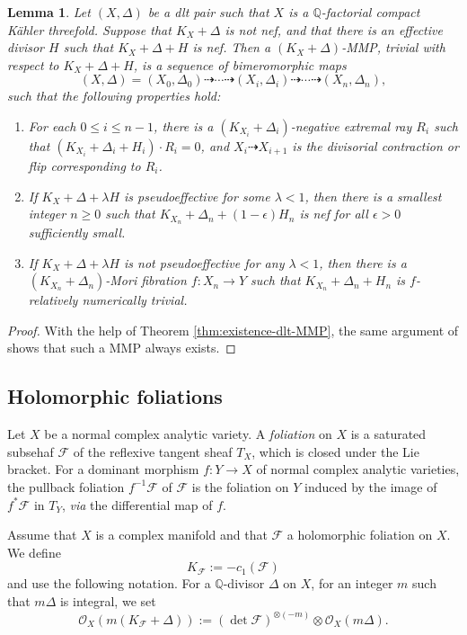 \documentclass[12pt]{amsart}
\newcommand{\<}{\leq}
\def\>{\geq}
\newcommand{\bir}{\dashrightarrow}
\newcommand{\D}{\Delta}
\def\mcO{\mathcal{O}}
\def\mcF{\mathcal{F}}
\newtheorem{lemma}[theorem]{Lemma}
\theoremstyle{remark}
\theoremstyle{definition}
\theoremstyle{definition}
\numberwithin{equation}{section}
\theoremstyle{definition}
\theoremstyle{definition}
\begin{document}
\begin{lemma}
\label{lem:special-mmp}  
Let $(X,\D)$ be a dlt pair such that $X$ is a $\mathbb{Q}$-factorial  compact K\"ahler threefold.  
    Suppose that $K_X+\Delta$ is   not nef, 
    and that there is an effective  divisor $H$  such that $K_X+\Delta+H$ is nef. 
    Then  a $(K_X+\Delta)$-MMP, trivial with respect to $K_X+\Delta+H$, is a sequence of bimeromorphic maps
 \[
        (X, \Delta)=(X_0, \Delta_0)\bir  \cdots \bir (X_i, \Delta_i)\bir\cdots \bir (X_n, \Delta_n), 
 \]
 such that the following properties hold:
\begin{enumerate}
\item For each $0\<i\<n-1$, there is a $(K_{X_i}+\Delta_i)$-negative extremal ray $R_i$ such that $(K_{X_i}+\Delta_i+H_i)\cdot R_i=0$, and $X_i\bir X_{i+1}$ is the divisorial contraction or flip corresponding  to $R_i$.
\item If $K_X+\Delta+\lambda H$ is pseudoeffective for some $ \lambda<1$, then 
there is a  smallest integer $n\> 0$  such that $K_{X_n}+\Delta_n+(1-\epsilon)H_n$ is nef for all $\epsilon >0$ sufficiently small. 
\item If $K_X+\Delta+\lambda H$ is not pseudoeffective for any $\lambda<1$, then  
there is a  $(K_{X_n}+\Delta_n)$-Mori fibration $f\colon X_n\to Y$ such that $K_{X_n}+\Delta_n+H_n$ is $f$-relatively numerically trivial. 
\end{enumerate} 
\end{lemma}   


\begin{proof}
    With the help of Theorem \ref{thm:existence-dlt-MMP}, the same argument of \cite[Theorem 4.5]{DasOu2022} shows that such a MMP always exists. 
\end{proof} 

 


\subsection{Holomorphic foliations} \label{subsec:holomorphic-foliation}
Let $X$ be a normal complex analytic variety. 
A \emph{foliation} on $X$ is a saturated subsehaf $\mcF$ of the reflexive tangent sheaf $T_{X}$, which is closed under the Lie bracket.  
For a  dominant  morphism  $f\colon Y\to X$  of normal complex analytic varieties, 
the pullback foliation   $f^{-1}\mcF$ of $\mcF$  is the foliation  on $Y$ induced by the image of $f^*\mcF$ in $T_Y$, 
\textit{via} the differential map of $f$.

Assume that $X$ is a complex manifold and that $\mcF$ a holomorphic foliation on $X$.    
We define 
\[K_\mcF := - c_1(\mcF) \] 
and  use the following notation. 
For  a $\mathbb{Q}$-divisor $\D$ on $X$, for an integer $m$ such that $m\D$ is integral, we set 
\[
\mcO_X(m(K_\mcF + \D)) := (\det \mcF)^{\otimes (-m)} \otimes \mcO_X(m\D). 
\]
\end{document}
